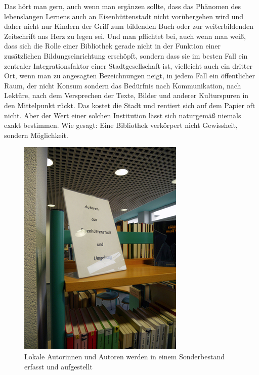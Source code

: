 \documentclass[a4paper,
fontsize=11pt,
oneside,
numbers=noperiodatend,
parskip=half-,
bibliography=totoc,
final
]{scrartcl}
\begin{document}
Das hört man gern, auch wenn man ergänzen sollte, dass das Phänomen des
lebenslangen Lernens auch an Eisenhüttenstadt nicht vorübergehen wird
und daher nicht nur Kindern der Griff zum bildenden Buch oder zur
weiterbildenden Zeitschrift ans Herz zu legen sei. Und man pflichtet
bei, auch wenn man weiß, dass sich die Rolle einer Bibliothek gerade
nicht in der Funktion einer zusätzlichen Bildungseinrichtung erschöpft,
sondern dass sie im besten Fall ein zentraler Integrationsfaktor einer
Stadtgesellschaft ist, vielleicht auch ein dritter Ort, wenn man zu
angesagten Bezeichnungen neigt, in jedem Fall ein öffentlicher Raum, der
nicht Konsum sondern das Bedürfnis nach Kommunikation, nach Lektüre,
nach dem Versprechen der Texte, Bilder und anderer Kulturspuren in den
Mittelpunkt rückt. Das kostet die Stadt und rentiert sich auf dem Papier
oft nicht. Aber der Wert einer solchen Institution lässt sich naturgemäß
niemals exakt bestimmen. Wie gesagt: Eine Bibliothek verkörpert nicht
Gewissheit, sondern Möglichkeit.

\begin{figure}
\centering
\includegraphics{img/image_5.jpg}
\caption{Lokale Autorinnen und Autoren werden in einem Sonderbestand
erfasst und aufgestellt}
\end{figure}
\end{document}
